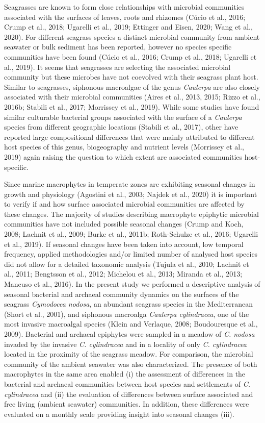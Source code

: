\documentclass[
  12pt,
]{article}
\begin{document}
Seagrasses are known to form close relationships with microbial
communities associated with the surfaces of leaves, roots and rhizomes
(Cúcio et al., 2016; Crump et al., 2018; Ugarelli et al., 2019; Ettinger
and Eisen, 2020; Wang et al., 2020). For different seagrass species a
distinct microbial community from ambient seawater or bulk sediment has
been reported, however no species specific communities have been found
(Cúcio et al., 2016; Crump et al., 2018; Ugarelli et al., 2019). It
seems that seagrasses are selecting the associated microbial community
but these microbes have not coevolved with their seagrass plant host.
Similar to seagrasses, siphonous macroalgae of the genus \emph{Caulerpa}
are also closely associated with their microbial communities (Aires et
al., 2013, 2015; Rizzo et al., 2016b; Stabili et al., 2017; Morrissey et
al., 2019). While some studies have found similar culturable bacterial
groups associated with the surface of a \emph{Caulerpa} species from
different geographic locations (Stabili et al., 2017), other have
reported large compositional differences that were mainly attributed to
different host species of this genus, biogeography and nutrient levels
(Morrissey et al., 2019) again raising the question to which extent are
associated communities host-specific.

Since marine macrophytes in temperate zones are exhibiting seasonal
changes in growth and physiology (Agostini et al., 2003; Najdek et al.,
2020) it is important to verify if and how surface associated microbial
communities are affected by these changes. The majority of studies
describing macrophyte epiphytic microbial communities have not included
possible seasonal changes (Crump and Koch, 2008; Lachnit et al., 2009;
Burke et al., 2011b; Roth-Schulze et al., 2016; Ugarelli et al., 2019).
If seasonal changes have been taken into account, low temporal
frequency, applied methodologies and/or limited number of analysed host
species did not allow for a detailed taxonomic analysis (Tujula et al.,
2010; Lachnit et al., 2011; Bengtsson et al., 2012; Michelou et al.,
2013; Miranda et al., 2013; Mancuso et al., 2016). In the present study
we performed a descriptive analysis of seasonal bacterial and archaeal
community dynamics on the surfaces of the seagrass \emph{Cymodocea
nodosa}, an abundant seagrass species in the Mediterranean (Short et
al., 2001), and siphonous macroalga \emph{Caulerpa cylindracea}, one of
the most invasive macroalgal species (Klein and Verlaque, 2008;
Boudouresque et al., 2009). Bacterial and archaeal epiphytes were
sampled in a meadow of \emph{C. nodosa} invaded by the invasive \emph{C.
cylindracea} and in a locality of only \emph{C. cylindracea} located in
the proximity of the seagrass meadow. For comparison, the microbial
community of the ambient seawater was also characterized. The presence
of both macrophytes in the same area enabled (i) the assessment of
differences in the bacterial and archaeal communities between host
species and settlements of \emph{C. cylindracea} and (ii) the evaluation
of differences between surface associated and free living (ambient
seawater) communities. In addition, these differences were evaluated on
a monthly scale providing insight into seasonal changes (iii).
\end{document}
